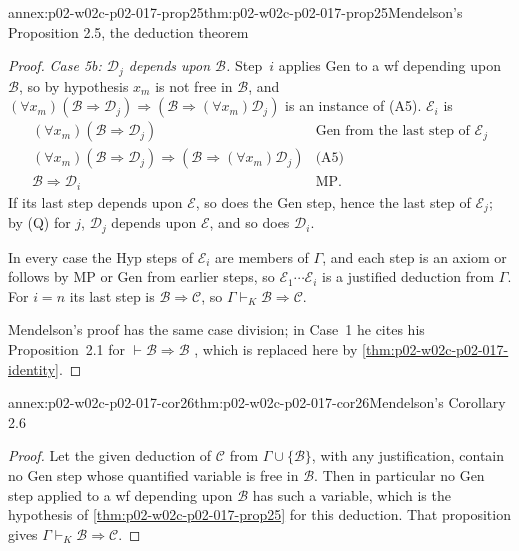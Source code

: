 \begin{annexitem}{annex:p02-w02c-p02-017-prop25}{thm:p02-w02c-p02-017-prop25}{Mendelson's Proposition 2.5, the deduction theorem}
\begin{proof}
\emph{Case 5b: \(\mathscr D_j\) depends upon \(\mathscr B\).}  Step~\(i\)
applies Gen to a wf depending upon \(\mathscr B\), so by hypothesis \(x_m\)
is not free in \(\mathscr B\), and
\((\forall x_m)(\mathscr B\Rightarrow\mathscr D_j)\Rightarrow
(\mathscr B\Rightarrow(\forall x_m)\mathscr D_j)\) is an instance of (A5).
\(\mathcal E_i\) is
\[
\begin{array}{ll}
 (\forall x_m)(\mathscr B\Rightarrow\mathscr D_j)
   & \text{Gen from the last step of }\mathcal E_j\\
 (\forall x_m)(\mathscr B\Rightarrow\mathscr D_j)\Rightarrow
 (\mathscr B\Rightarrow(\forall x_m)\mathscr D_j) & \text{(A5)}\\
 \mathscr B\Rightarrow\mathscr D_i & \text{MP}.
\end{array}
\]
If its last step depends upon \(\mathscr E\), so does the Gen step, hence the
last step of \(\mathcal E_j\); by (Q) for \(j\), \(\mathscr D_j\) depends upon
\(\mathscr E\), and so does \(\mathscr D_i\).

In every case the Hyp steps of \(\mathcal E_i\) are members of \(\Gamma\),
and each step is an axiom or follows by MP or Gen from earlier steps, so
\(\mathcal E_1\cdots\mathcal E_i\) is a justified deduction from \(\Gamma\).
For \(i=n\) its last step is \(\mathscr B\Rightarrow\mathscr C\), so
\(\Gamma\vdash_K\mathscr B\Rightarrow\mathscr C\).

Mendelson's proof has the same case division; in Case~1 he cites his
Proposition~2.1 for \(\vdash\mathscr B\Rightarrow\mathscr B\)
\cite[\S 2.4, p.~74]{Mendelson1997}, which is replaced here by
\cref{thm:p02-w02c-p02-017-identity}.
\end{proof}
\end{annexitem}

\begin{annexitem}{annex:p02-w02c-p02-017-cor26}{thm:p02-w02c-p02-017-cor26}{Mendelson's Corollary 2.6}
\begin{proof}
Let the given deduction of \(\mathscr C\) from \(\Gamma\cup\{\mathscr B\}\),
with any justification, contain no Gen step whose quantified variable is free
in \(\mathscr B\).  Then in particular no Gen step applied to a wf depending
upon \(\mathscr B\) has such a variable, which is the hypothesis of
\cref{thm:p02-w02c-p02-017-prop25} for this deduction.  That proposition gives
\(\Gamma\vdash_K\mathscr B\Rightarrow\mathscr C\).
\end{proof}
\end{annexitem}

